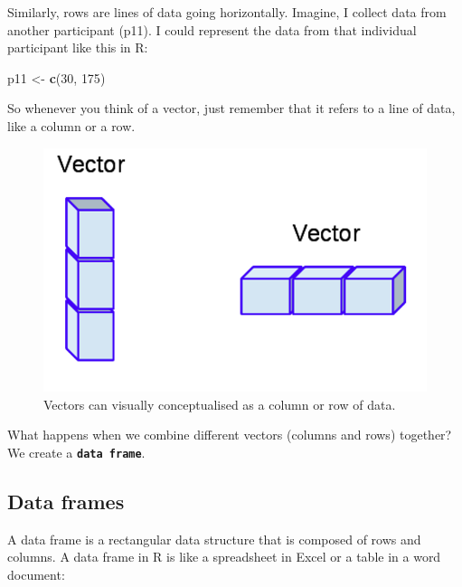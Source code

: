 \documentclass[
]{book}
\newenvironment{Shaded}{\begin{snugshade}}{\end{snugshade}}
\newcommand{\DecValTok}[1]{\textcolor[rgb]{0.00,0.00,0.81}{#1}}
\newcommand{\FunctionTok}[1]{\textcolor[rgb]{0.13,0.29,0.53}{\textbf{#1}}}
\newcommand{\NormalTok}[1]{#1}
\newcommand{\OtherTok}[1]{\textcolor[rgb]{0.56,0.35,0.01}{#1}}
\begin{document}
Similarly, rows are lines of data going horizontally. Imagine, I collect data from another participant (p11). I could represent the data from that individual participant like this in R:

\begin{Shaded}
\begin{Highlighting}[]
\NormalTok{p11 }\OtherTok{\textless{}{-}} \FunctionTok{c}\NormalTok{(}\DecValTok{30}\NormalTok{, }\DecValTok{175}\NormalTok{)}
\end{Highlighting}
\end{Shaded}

So whenever you think of a vector, just remember that it refers to a line of data, like a column or a row.

\begin{figure}
\centering
\includegraphics{img/03-vectors-summarised.png}
\caption{\label{fig:unnamed-chunk-82}Vectors can visually conceptualised as a column or row of data.}
\end{figure}

What happens when we combine different vectors (columns and rows) together? We create a \textbf{\texttt{data\ frame}}.

\subsection{Data frames}\label{data-frames}

A data frame is a rectangular data structure that is composed of rows and columns. A data frame in R is like a spreadsheet in Excel or a table in a word document:
\end{document}
